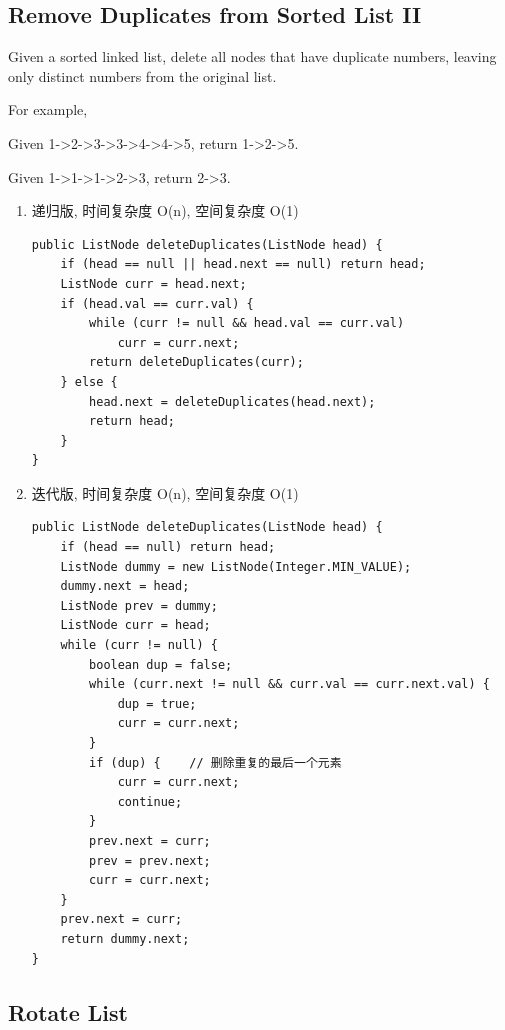 \documentclass[12pt]{book}
\begin{document}
\subsection{Remove Duplicates from Sorted List II}
\label{sec-3-2-5}
Given a sorted linked list, delete all nodes that have duplicate numbers, leaving only distinct numbers from the original list.

For example,

Given 1->2->3->3->4->4->5, return 1->2->5.

Given 1->1->1->2->3, return 2->3.

\begin{enumerate}
\item 递归版, 时间复杂度 O(n), 空间复杂度 O(1)
\label{sec-3-2-5-1}
\lstset{language=java,label= ,caption= ,numbers=none}
\begin{lstlisting}
public ListNode deleteDuplicates(ListNode head) {
    if (head == null || head.next == null) return head;  
    ListNode curr = head.next;
    if (head.val == curr.val) {
        while (curr != null && head.val == curr.val) 
            curr = curr.next;
        return deleteDuplicates(curr);
    } else {
        head.next = deleteDuplicates(head.next);
        return head;
    }
}
\end{lstlisting}

\item 迭代版, 时间复杂度 O(n), 空间复杂度 O(1)
\label{sec-3-2-5-2}

\lstset{language=java,label= ,caption= ,numbers=none}
\begin{lstlisting}
public ListNode deleteDuplicates(ListNode head) {
    if (head == null) return head;  
    ListNode dummy = new ListNode(Integer.MIN_VALUE);
    dummy.next = head;
    ListNode prev = dummy;
    ListNode curr = head;
    while (curr != null) {
        boolean dup = false;
        while (curr.next != null && curr.val == curr.next.val) {
            dup = true;
            curr = curr.next;
        }
        if (dup) {    // 删除重复的最后一个元素
            curr = curr.next;
            continue;
        }
        prev.next = curr;
        prev = prev.next;
        curr = curr.next;
    }
    prev.next = curr;
    return dummy.next;
}
\end{lstlisting}
\end{enumerate}

\subsection{Rotate List}
\label{sec-3-2-6}
\end{document}
